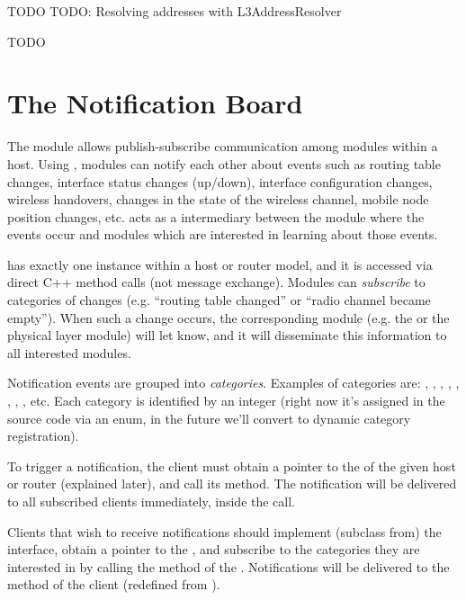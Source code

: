 \ifdraft TODO
TODO: Resolving addresses with L3AddressResolver
\fi


\ifdraft TODO
\section{The Notification Board}

The  module allows publish-subscribe
communication among modules within a host. Using
, modules can notify each other about
events such as routing table changes, interface status changes
(up/down), interface configuration changes, wireless handovers, changes in
the state of the wireless channel, mobile node position changes, etc.
 acts as a intermediary between the module where
the events occur and modules which are interested in learning about
those events.

 has exactly one instance within a host or
router model, and it is accessed via direct C++ method calls (not message
exchange). Modules can \textit{subscribe} to categories of changes
(e.g. ``routing table changed'' or ``radio channel became empty''). When
such a change occurs, the corresponding module (e.g. the
 or the physical layer module) will let
 know, and it will disseminate this information
to all interested modules.

\sloppypar Notification events are grouped into \textit{categories}.
Examples of categories are: ,
, ,
, ,
, , ,
etc. Each category is identified by an integer (right now it's assigned in
the source code via an enum, in the future we'll convert to dynamic
category registration).

To trigger a notification, the client must obtain a pointer to the
 of the given host or router (explained later),
and call its  method. The notification will
be delivered to all subscribed clients immediately, inside the
 call.

Clients that wish to receive notifications should implement (subclass from)
the  interface, obtain a pointer to the
, and subscribe to the categories they are
interested in by calling the  method of the
. Notifications will be delivered to the
 method of the client (redefined from
).


